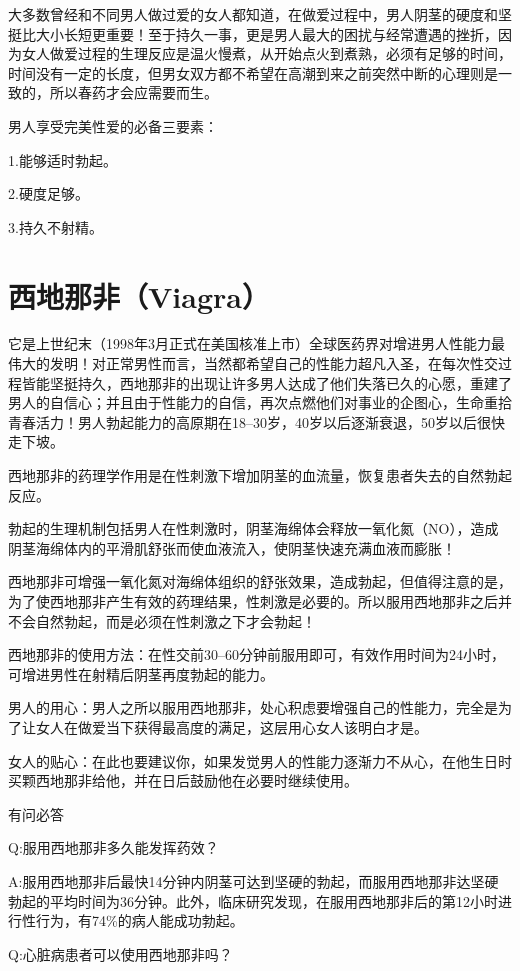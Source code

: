 \documentclass[12pt,UTF8]{ctexbook}
\begin{document}
大多数曾经和不同男人做过爱的女人都知道，在做爱过程中，男人阴茎的硬度和坚挺比大小长短更重要！至于持久一事，更是男人最大的困扰与经常遭遇的挫折，因为女人做爱过程的生理反应是温火慢煮，从开始点火到煮熟，必须有足够的时间，时间没有一定的长度，但男女双方都不希望在高潮到来之前突然中断的心理则是一致的，所以春药才会应需要而生。

男人享受完美性爱的必备三要素：

1.能够适时勃起。

2.硬度足够。

3.持久不射精。

\section{西地那非（Viagra）}

它是上世纪末（1998年3月正式在美国核准上市）全球医药界对增进男人性能力最伟大的发明！对正常男性而言，当然都希望自己的性能力超凡入圣，在每次性交过程皆能坚挺持久，西地那非的出现让许多男人达成了他们失落已久的心愿，重建了男人的自信心；并且由于性能力的自信，再次点燃他们对事业的企图心，生命重拾青春活力！男人勃起能力的高原期在18--30岁，40岁以后逐渐衰退，50岁以后很快走下坡。

西地那非的药理学作用是在性刺激下增加阴茎的血流量，恢复患者失去的自然勃起反应。

勃起的生理机制包括男人在性刺激时，阴茎海绵体会释放一氧化氮（NO），造成阴茎海绵体内的平滑肌舒张而使血液流入，使阴茎快速充满血液而膨胀！

西地那非可增强一氧化氮对海绵体组织的舒张效果，造成勃起，但值得注意的是，为了使西地那非产生有效的药理结果，性刺激是必要的。所以服用西地那非之后并不会自然勃起，而是必须在性刺激之下才会勃起！

西地那非的使用方法：在性交前30--60分钟前服用即可，有效作用时间为24小时，可增进男性在射精后阴茎再度勃起的能力。

男人的用心：男人之所以服用西地那非，处心积虑要增强自己的性能力，完全是为了让女人在做爱当下获得最高度的满足，这层用心女人该明白才是。

女人的贴心：在此也要建议你，如果发觉男人的性能力逐渐力不从心，在他生日时买颗西地那非给他，并在日后鼓励他在必要时继续使用。

有问必答

Q:服用西地那非多久能发挥药效？

A:服用西地那非后最快14分钟内阴茎可达到坚硬的勃起，而服用西地那非达坚硬勃起的平均时间为36分钟。此外，临床研究发现，在服用西地那非后的第12小时进行性行为，有74\%的病人能成功勃起。

Q:心脏病患者可以使用西地那非吗？
\end{document}
